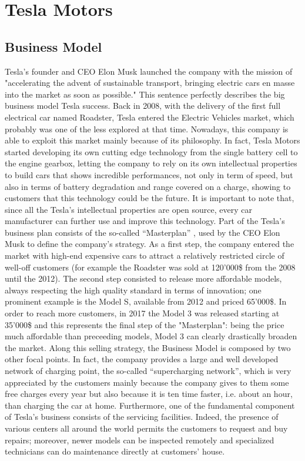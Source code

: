 \section{Tesla Motors}

\subsection{Business Model}
Tesla's founder and CEO Elon Musk launched the company with the mission of "accelerating the advent of sustainable transport, bringing electric cars en masse into the market as soon as possible." This sentence perfectly describes the big business model Tesla success.
Back in 2008, with the delivery of the first full electrical car named Roadster, Tesla entered the Electric Vehicles market, which probably was one of the less explored at that time.  
Nowadays, this company is able to exploit this market mainly because of its philosophy. In fact, Tesla Motors started developing its own cutting edge technology from the single battery cell to the engine gearbox, letting the company to rely on its own intellectual properties to build cars that shows incredible performances, not only in term of speed, but also in terms of battery degradation and range covered on a charge, showing to customers that this technology could be the future. 
It is important to note that, since all the Tesla’s intellectual properties are open source, every car manufacturer can further use and improve this technology.
Part of the Tesla’s business plan consists of the so-called “Masterplan” \cite{TeslaMasterplan}, used by the CEO Elon Musk to define the company’s strategy. As a first step, the company entered the market with high-end expensive cars to attract a relatively restricted circle of well-off customers (for example the Roadster was sold at 120'000\$ from the 2008 until the 2012). The second step consisted to release more affordable models, always respecting the high quality standard in terms of innovation; one prominent example is the Model S, available from 2012 and priced 65'000\$. In order to reach more customers, in 2017 the Model 3 was released starting at 35'000\$ and this represents the final step of the "Masterplan": being the price much affordable than preceeding models, Model 3 can clearly drastically broaden the market.
Along this selling strategy, the Business Model is composed by two other focal points.
In fact, the company provides a large and well developed network of charging point, the so-called “supercharging network”, which is very appreciated by the customers mainly because the company gives to them some free charges every year but also because it is ten time faster, i.e. about an hour, than charging the car at home.
Furthermore, one of the fundamental component of Tesla's business consists of the servicing facilities. Indeed, the presence of various centers all around the world permits the customers to request and buy repairs; moreover, newer models can be inspected remotely and specialized technicians can do maintenance directly at customers' house.

